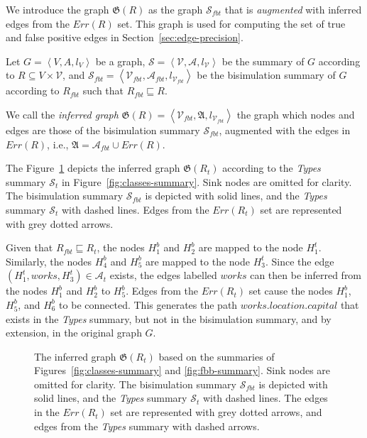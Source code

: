 We introduce the graph $\mathfrak{G}(R)$ as the graph $\mathcal{S}_{fbt}$ that is \emph{augmented} with inferred edges from the $Err(R)$ set. This graph is used for computing the set of true and false positive edges in Section~\ref{sec:edge-precision}.

\begin{definition}
Let $G=\left\langle V, A, l_V \right\rangle$ be a graph, $\mathcal{S} = \left\langle \mathcal{V}, \mathcal{A}, l_{\mathcal{V}} \right\rangle$ be the summary of $G$ according to $R \subseteq V \times \mathcal{V}$, and $\mathcal{S}_{fbt} = \left\langle \mathcal{V}_{fbt}, \mathcal{A}_{fbt}, l_{\mathcal{V}_{fbt}} \right\rangle$ be the bisimulation summary of $G$ according to $R_{fbt}$ such that $R_{fbt} \sqsubseteq R$.

We call the \emph{inferred graph} $\mathfrak{G}(R) = \left\langle \mathcal{V}_{fbt}, \mathfrak{A}, l_{\mathcal{V}_{fbt}} \right\rangle$ the graph which nodes and edges are those of the bisimulation summary $\mathcal{S}_{fbt}$, augmented with the edges in $Err(R)$, i.e., $\mathfrak{A} = \mathcal{A}_{fbt} \cup Err(R)$.
\end{definition}

The Figure~\ref{fig:accuracy} depicts the inferred graph $\mathfrak{G}(R_t)$ according to the \emph{Types} summary $\mathcal{S}_t$ in Figure~\ref{fig:classes-summary}.
Sink nodes are omitted for clarity. The bisimulation summary $\mathcal{S}_{fbt}$ is depicted with solid lines, and the \emph{Types} summary $\mathcal{S}_t$ with dashed lines. Edges from the $Err(R_t)$ set are represented with grey dotted arrows.

Given that $R_{fbt} \sqsubseteq R_t$, the nodes $H^b_1$ and $H^b_2$ are mapped to the node $H^t_1$. Similarly, the nodes $H^b_4$ and $H^b_5$ are mapped to the node $H^t_3$. Since the edge $(H^t_1, works, H^t_3) \in \mathcal{A}_t$ exists, the edges labelled $works$ can then be inferred from the nodes $H^b_1$ and $H^b_2$ to $H^b_5$. Edges from the $Err(R_t)$ set cause the nodes $H^b_1$, $H^b_5$, and $H^b_6$ to be connected. This generates the path $works.location.capital$ that exists in the \emph{Types} summary, but not in the bisimulation summary, and by extension, in the original graph $G$.

\begin{figure}
	\centering
	\resizebox{\textwidth}{!}{
		
	}
	\caption{The inferred graph $\mathfrak{G}(R_t)$ based on the summaries of Figures~\ref{fig:classes-summary} and \ref{fig:fbb-summary}.
	Sink nodes are omitted for clarity. The bisimulation summary $\mathcal{S}_{fbt}$ is depicted with solid lines, and the \emph{Types} summary $\mathcal{S}_t$ with dashed lines. The edges in the $Err(R_t)$ set are represented with grey dotted arrows, and edges from the \emph{Types} summary with dashed arrows.}
	\label{fig:accuracy}
\end{figure}

